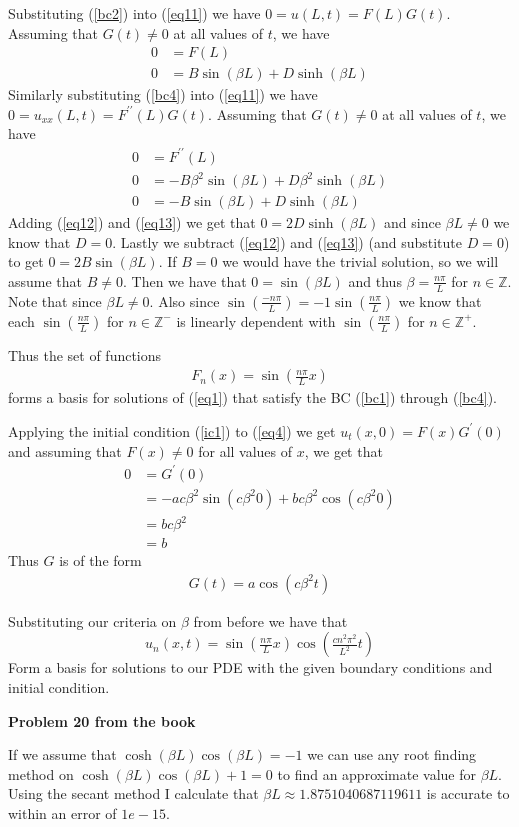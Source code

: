 \documentclass[12pt]{article}
\newcommand{\problem}[1]{\hspace{-4 ex} \large \textbf{Problem #1} }
\newcommand{\ZZ}{\mathbb{Z}}
\begin{document}
	Substituting (\ref{bc2}) into (\ref{eq11}) we have $0 = u(L,t) = F(L)G(t)$. Assuming that $G(t) \neq 0$ at all values of $t$, we have
	\begin{align}
		0 & = F(L) \nonumber \\
		0 & = B \sin(\beta L) + D \sinh(\beta L) \label{eq12}
	\end{align}
	Similarly substituting (\ref{bc4}) into (\ref{eq11}) we have $0 = u_{xx}(L,t) = F^{\prime\prime}(L)G(t)$. Assuming that $G(t) \neq 0$ at all values of $t$, we have
	\begin{align}
	0 & = F^{\prime\prime}(L) \nonumber \\
	0 & = -B \beta^2\sin(\beta L) + D \beta^2\sinh(\beta L) \nonumber \\
	0 & = -B \sin(\beta L) + D \sinh(\beta L) \label{eq13}
	\end{align}
	Adding (\ref{eq12}) and (\ref{eq13}) we get that $0=2D \sinh (\beta L)$ and since $\beta L \neq 0$ we know that $D=0$. Lastly we subtract (\ref{eq12}) and (\ref{eq13}) (and substitute $D=0$) to get $ 0 = 2B \sin(\beta L)$. If $B=0$ we would have the trivial solution, so we will assume that $B \neq 0$. Then we have that $0 = \sin(\beta L)$ and thus $\beta = \tfrac{n\pi}{L}$ for $n \in \ZZ$. Note that since $\beta L \neq 0$. Also since $\sin(\tfrac{-n\pi}{L}) = -1\sin(\tfrac{n\pi}{L})$ we know that each $\sin(\tfrac{n\pi}{L})$ for $n \in \ZZ^-$ is linearly dependent with $\sin(\tfrac{n\pi}{L})$ for $n \in \ZZ^+$. \bigbreak
	
	Thus the set of functions
	\begin{align}
		F_n(x) = \sin(\tfrac{n\pi}{L}x) \label{eq14}
	\end{align}
	forms a basis for solutions of (\ref{eq1}) that satisfy the BC (\ref{bc1}) through (\ref{bc4}). \bigbreak
	
	Applying the initial condition (\ref{ic1}) to (\ref{eq4}) we get $u_t(x,0) = F(x)G^\prime(0)$ and assuming that $F(x) \neq 0$ for all values of $x$, we get that 
	\begin{align*}
		0 & = G^\prime(0) \\
		& = -a c \beta^2 \sin(c \beta^2 0) + b c \beta^2 \cos(c \beta^2 0) \\
		& = b c \beta^2 \\
		& = b
	\end{align*}
	Thus $G$ is of the form
	\begin{align}
		G(t) = a \cos(c \beta^2 t)
	\end{align}
	
	Substituting our criteria on $\beta$ from before we have that
	$$
		u_n(x,t) = \sin(\tfrac{n\pi}{L}x) \cos(\tfrac{cn^2 \pi^2}{L^2}t)
	$$
	Form a basis for solutions to our PDE with the given boundary conditions and initial condition.
	
\problem{20 from the book}
	
	If we assume that $\cosh(\beta L) \cos(\beta L) = -1$ we can use any root finding method on $\cosh(\beta L) \cos(\beta L) +1 = 0$ to find an approximate value for $\beta L$. Using the secant method I calculate that $\beta L \approx 1.8751040687119611$ is accurate to within an error of $1e-15$. 
	
\end{document}
